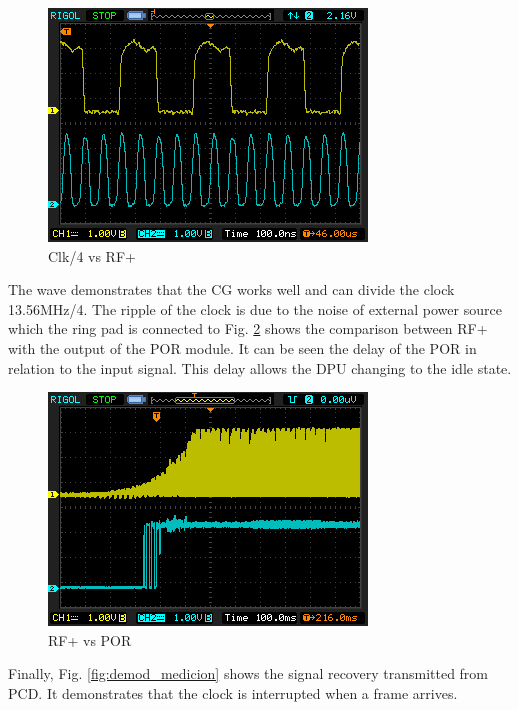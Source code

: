 \documentclass{article} %
\begin{document}
\begin{multicols}{2}
\begin{figure}[H]
    \centering
    \includegraphics[scale=0.5]{Images/ImagenesTesina/mediciones/clk.png}
    \caption{Clk/4 vs RF+}
    \label{fig:clock_medicion}
\end{figure}

The wave demonstrates that the CG works well and can divide the clock 13.56MHz/4. The ripple of the clock is due to the noise of
external power source which the ring pad is connected to
Fig. \ref{fig:por_medicion} shows the comparison between RF+ with the output of the POR module. It can be seen the delay of the
POR in relation to the input signal. This delay allows the
DPU changing to the idle state.

\begin{figure}[H]
    \centering
    \includegraphics[scale=0.5]{Images/ImagenesTesina/mediciones/por.png}
    \caption{RF+ vs POR}
    \label{fig:por_medicion}
\end{figure}


Finally, Fig. \ref{fig:demod_medicion} shows the signal recovery transmitted from
PCD. It demonstrates that the clock is interrupted when a
frame arrives.


\end{multicols}
\end{document}
